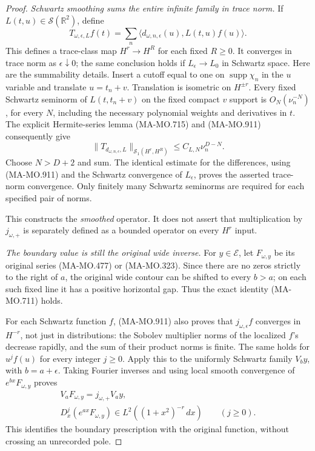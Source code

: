 \begin{proof}
\emph{Schwartz smoothing sums the entire infinite family in trace norm.}
If \(L(t,u)\in\mathscr S(\mathbb R^2)\), define
\[
       T_{\omega,\epsilon,L}f(t)
            =\sum_n
                 \langle d_{\omega,n,\epsilon}(u),
                                      L(t,u)f(u)\rangle .
 \tag{MA-MO.914}
\]
This defines a trace-class map \(H^r\to H^R\)
for each fixed \(R\ge0\). It converges in
trace norm as \(\epsilon\downarrow0\);
the same conclusion holds if
\(L_\epsilon\to L_0\) in Schwartz space.
Here are the summability details. Insert a
cutoff equal to one on \(\operatorname{supp}\chi_n\)
in the \(u\) variable and translate \(u=t_n+v\).
Translation is isometric on \(H^{\pm r}\).
Every fixed Schwartz seminorm of
\(L(t,t_n+v)\) on the fixed compact \(v\)
support is \(O_N(\nu_n^{-N})\), for every
\(N\), including the necessary polynomial
weights and derivatives in \(t\).
The explicit Hermite-series lemma
(MA-MO.715) and (MA-MO.911) consequently give
\[
  \bigl\|T_{d_{\omega,n,\epsilon},L}\bigr\|_{\mathcal S_1(H^r,H^R)}
                        \le C_{L,N}\nu_n^{D-N}.
 \tag{MA-MO.915}
\]
Choose \(N>D+2\) and sum. The identical
estimate for the differences, using
(MA-MO.911) and the Schwartz convergence
of \(L_\epsilon\), proves the asserted
trace-norm convergence. Only finitely
many Schwartz seminorms are required
for each specified pair of norms.

This constructs the \emph{smoothed} operator.
It does not assert that multiplication by
\(j_{\omega,+}\) is separately defined
as a bounded operator on every \(H^r\) input.

\emph{The boundary value is still the original wide inverse.}
For \(y\in\mathcal E\), let \(F_{\omega,y}\)
be its original series (MA-MO.477) or
(MA-MO.323). Since there are no zeros
strictly to the right of \(a\), the
original wide contour can be shifted
to every \(b>a\); on each such fixed
line it has a positive horizontal gap.
Thus the exact identity (MA-MO.711) holds.

For each Schwartz function \(f\),
(MA-MO.911) also proves that
\(j_{\omega,\epsilon}f\) converges in
\(H^{-r}\), not just in distributions:
the Sobolev multiplier norms of the
localized \(f\)'s decrease rapidly, and
the sum of their product norms is finite.
The same holds for \(u^jf(u)\) for every
integer \(j\ge0\).
Apply this to the uniformly Schwartz
family \(V_by\), with \(b=a+\epsilon\).
Taking Fourier inverses and using local
smooth convergence of \(e^{bx}F_{\omega,y}\)
proves
\[
 \begin{gathered}
      V_aF_{\omega,y}=j_{\omega,+}V_ay,\\
 D_x^j(e^{ax}F_{\omega,y})
             \in L^2((1+x^2)^{-r}\,dx)
                         \qquad(j\ge0).
 \end{gathered}
 \tag{MA-MO.916}
\]
This identifies the boundary prescription
with the original function, without crossing
an unrecorded pole.


\end{proof}

